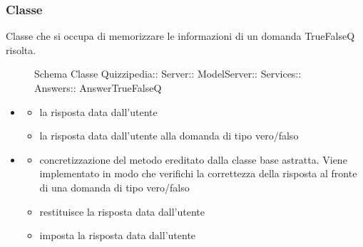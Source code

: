 \subsubsection{Classe }
Classe che si occupa di memorizzare le informazioni di un domanda TrueFalseQ risolta.
\begin{figure}[H]
\centering
\noindent{}
\caption[Schema Classe AnswerTrueFalseQ]{Schema Classe Quizzipedia:: Server:: ModelServer:: Services:: Answers:: AnswerTrueFalseQ}
\end{figure}
\begin{itemize}
\item {}
\begin{itemize}
\item {}
\newline
la risposta data dall'utente
\item {}
\newline
la risposta data dall'utente alla domanda di tipo vero/falso
\end{itemize}
\item {}
\begin{itemize}
\item {}
\newline
concretizzazione del metodo ereditato dalla classe base astratta. Viene implementato in modo che verifichi la correttezza della risposta al fronte di una domanda di tipo vero/falso
\newline
\item {}
\newline
restituisce la risposta data dall'utente
\newline
\item {}
\newline
imposta la risposta data dall'utente
\newline
\end{itemize}
\end{itemize}
